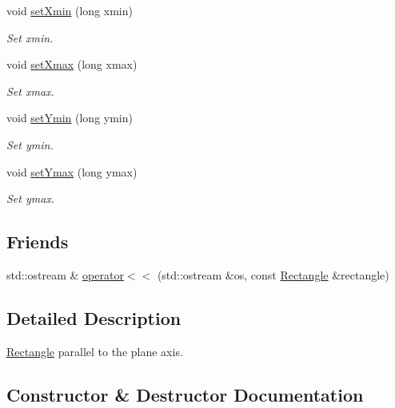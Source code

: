 \begin{DoxyCompactItemize}
void \hyperlink{classGeometry_1_1Rectangle_a9429d96831fcf302b35306187a1a5c87}{set\+Xmin} (long xmin)
\begin{DoxyCompactList}\small\item\em Set xmin. \end{DoxyCompactList}\item 
void \hyperlink{classGeometry_1_1Rectangle_af4a0d6ea20241c23ace59d198fd5de3c}{set\+Xmax} (long xmax)
\begin{DoxyCompactList}\small\item\em Set xmax. \end{DoxyCompactList}\item 
void \hyperlink{classGeometry_1_1Rectangle_a9cd50d8752fbf874d9979cf7189963f4}{set\+Ymin} (long ymin)
\begin{DoxyCompactList}\small\item\em Set ymin. \end{DoxyCompactList}\item 
void \hyperlink{classGeometry_1_1Rectangle_abc92fe5c878653505e409686aeb614f8}{set\+Ymax} (long ymax)
\begin{DoxyCompactList}\small\item\em Set ymax. \end{DoxyCompactList}\end{DoxyCompactItemize}
\subsection*{Friends}
\begin{DoxyCompactItemize}
\item 
std\+::ostream \& \hyperlink{classGeometry_1_1Rectangle_a6928c586de0f57714ed6e389186c94c2}{operator$<$$<$} (std\+::ostream \&os, const \hyperlink{classGeometry_1_1Rectangle}{Rectangle} \&rectangle)
\end{DoxyCompactItemize}


\subsection{Detailed Description}
\hyperlink{classGeometry_1_1Rectangle}{Rectangle} parallel to the plane axis. 

\subsection{Constructor \& Destructor Documentation}
